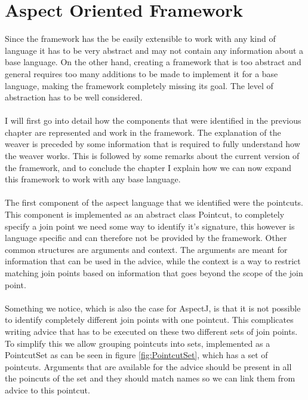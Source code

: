 \documentclass[a4paper]{report}
\begin{document}
\chapter{Aspect Oriented Framework}
Since the framework has the be easily extensible to work with any kind of language it has to be very abstract and may not contain any information about a base language. On the other hand, creating a framework that is too abstract and general requires too many additions to be made to implement it for a base language, making the framework completely missing its goal. The level of abstraction has to be well considered.\\
\\
I will first go into detail how the components that were identified in the previous chapter are represented and work in the framework. The explanation of the weaver is preceded by some information that is required to fully understand how the weaver works. This is followed by some remarks about the current version of the framework, and to conclude the chapter I explain how we can now expand this framework to work with any base language.\\
\\
The first component of the aspect language that we identified were the pointcuts. This component is implemented as an abstract class Pointcut, to completely specify a join point we need some way to identify it's signature, this however is language specific and can therefore not be provided by the framework. Other common structures are arguments and context. The arguments are meant for information that can be used in the advice, while the context is a way to restrict matching join points based on  information that goes beyond the scope of the join point.\\
\\
Something we notice, which is also the case for AspectJ, is that it is not possible to identify completely different join points with one pointcut. This complicates writing advice that has to be executed on these two different sets of join points. To simplify this we allow grouping pointcuts into sets, implemented as a PointcutSet as can be seen in figure \ref{fig:PointcutSet}, which has a set of pointcuts. Arguments that are available for the advice should be present in all the poincuts of the set and they should match names so we can link them from advice to this pointcut.
\end{document}
